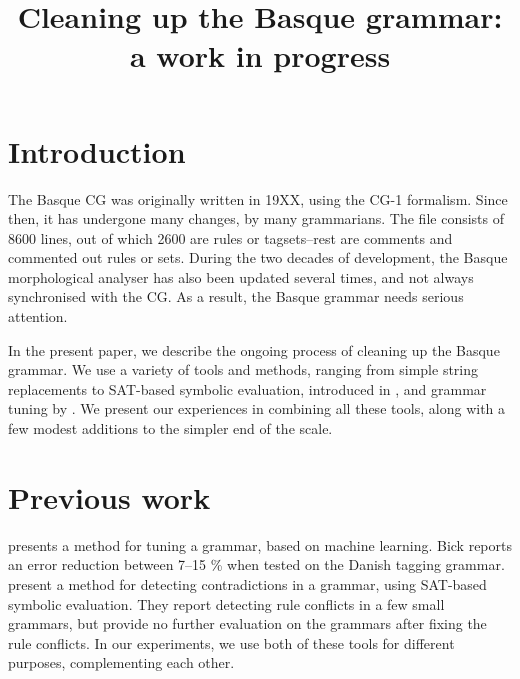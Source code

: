 \documentclass[11pt]{article}
\title{Cleaning up the Basque grammar: a work in progress}
\date{}
\begin{document}
\maketitle



\section{Introduction}

The Basque CG was originally written in 19XX, using the CG-1 formalism. Since then, it has undergone many changes, by many grammarians. The file consists of 8600 lines, out of which 2600 are rules or tagsets--rest are comments and commented out rules or sets. During the two decades of development, the Basque morphological analyser has also been updated several times, and not always synchronised with the CG. As a result, the Basque grammar needs serious attention.

In the present paper, we describe the ongoing process of cleaning up the Basque grammar. We use a variety of tools and methods, ranging from simple string replacements to SAT-based symbolic evaluation, introduced in , and grammar tuning by . We present our experiences in combining all these tools, along with a few modest additions to the simpler end of the scale.


\section{Previous work}

 presents a method for tuning a grammar, based on machine learning. Bick reports an error reduction between 7--15 \% when tested on the Danish tagging grammar.
 present a method for detecting contradictions in a grammar, using SAT-based symbolic evaluation.  They report detecting rule conflicts in a few small grammars, but provide no further evaluation on the grammars after fixing the rule conflicts. 
In our experiments, we use both of these tools for different purposes, complementing each other.
\end{document}
